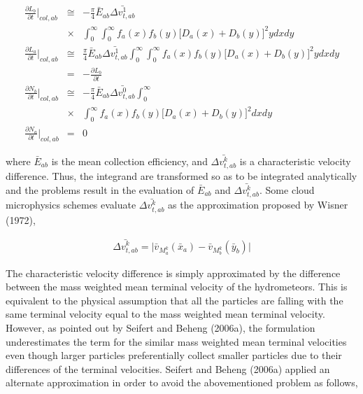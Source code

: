 \begin{eqnarray}
\frac{\partial L_{b}}{\partial t}\Bigr|_{col,ab}&\cong&-\frac{\pi}{4}\bar{E}_{ab}\bar{\Delta v_{t,ab}^{1}}\nonumber\\
&\times&\int_{0}^{\infty}\int_{0}^{\infty}f_{a}(x)f_{b}(y)\bigl[D_{a}(x)+D_{b}(y)\bigr]^{2}ydxdy\label{sn161}\\
\frac{\partial L_{a}}{\partial t}\Bigr|_{col,ab}&\cong&\frac{\pi}{4}\bar{E}_{ab}\bar{\Delta v_{t,ab}^{1}}\int_{0}^{\infty}\int_{0}^{\infty}f_{a}(x)f_{b}(y)\bigl[D_{a}(x)+D_{b}(y)\bigr]^{2}ydxdy\label{sn162}\nonumber\\
&=&-\frac{\partial L_{b}}{\partial t}\label{sn162}\\
\frac{\partial N_{b}}{\partial t}\Bigr|_{col,ab}&\cong&-\frac{\pi}{4}\bar{E}_{ab}\bar{\Delta v_{t,ab}^{0}}\int_{0}^{\infty}\nonumber\\
&\times&\int_{0}^{\infty}f_{a}(x)f_{b}(y)\bigl[D_{a}(x)+D_{b}(y)\bigr]^{2}dxdy\label{sn163}\\
\frac{\partial N_{a}}{\partial t}\Bigr|_{col,ab}&=&0\label{sn164}
\end{eqnarray}

where $\bar{E}_{ab}$ is the mean collection efficiency, and $\bar{\Delta v_{t,ab}^{k}}$ is a characteristic velocity difference. Thus, the integrand are transformed so as to be integrated analytically and the problems result in the evaluation of $\bar{E}_{ab}$ and $\bar{\Delta v_{t,ab}^{k}}$. Some cloud microphysics schemes evaluate $\bar{\Delta v_{t,ab}^{k}}$ as the approximation proposed by Wisner (1972),

\begin{eqnarray}
\bar{\Delta v_{t,ab}^{k}}=\bigl|\bar{v}_{M_{a}^{k}}(\bar{x}_{a})-\bar{v}_{M_{b}^{k}}(\bar{y}_{b})\bigr|\label{sn165}
\end{eqnarray}

The characteristic velocity difference is simply approximated by the difference between the mass weighted mean terminal velocity of the hydrometeors. This is equivalent to the physical assumption that all the particles are falling with the same terminal velocity equal to the mass weighted mean terminal velocity. However, as pointed out by Seifert and Beheng (2006a), the formulation underestimates the term for the similar mass weighted mean terminal velocities even though larger particles preferentially collect smaller particles due to their differences of the terminal velocities. Seifert and Beheng (2006a) applied an alternate approximation in order to avoid the abovementioned problem as follows,

